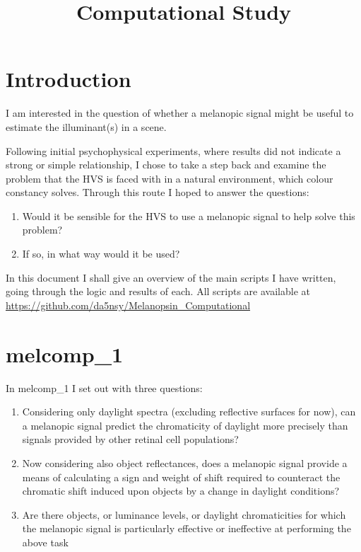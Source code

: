 \documentclass{article}
\title{Computational Study}
\author{}
\date{}
\begin{document}
\maketitle

\section{Introduction}

I am interested in the question of whether a melanopic signal might be useful to estimate the illuminant(s) in a scene.

Following initial psychophysical experiments, where results did not indicate a strong or simple relationship, I chose to take a step back and examine the problem that the HVS is faced with in a natural environment, which colour constancy solves. Through this route I hoped to answer the questions:
\begin{enumerate}
	\item Would it be sensible for the HVS to use a melanopic signal to help solve this problem?
	\item If so, in what way would it be used?
\end{enumerate}

In this document I shall give an overview of the main scripts I have written, going through the logic and results of each.
All scripts are available at \url{https://github.com/da5nsy/Melanopsin_Computational}

\section{melcomp\_1}

In melcomp\_1 I set out with three questions:
\begin{enumerate}
\item Considering only daylight spectra (excluding reflective surfaces for now), can a melanopic signal predict the chromaticity of daylight more precisely than signals provided by other retinal cell populations?
\item Now considering also object reflectances, does a melanopic signal provide a means of calculating a sign and weight of shift required to counteract the chromatic shift induced upon objects by a change in daylight conditions?
\item Are there objects, or luminance levels, or daylight chromaticities for which the melanopic signal is particularly effective or ineffective at performing the above task
\end{enumerate}
\end{document}

